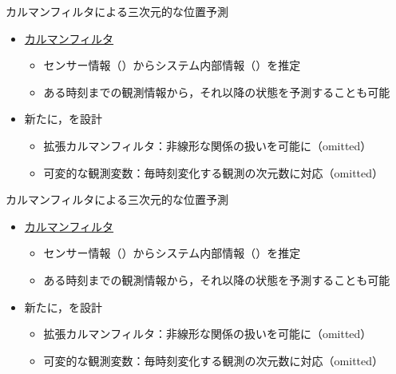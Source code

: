 \begin{frame}[noframenumbering]{カルマンフィルタによる三次元的な位置予測}
    \begin{itemize}
        \item \uline{カルマンフィルタ} \cite{bishop2001introduction}
        \begin{itemize}
            \item センサー情報（）からシステム内部情報（）を推定
            \item ある時刻までの観測情報から，それ以降の状態を予測することも可能
        \end{itemize}
        \item 新たに，を設計
        \begin{itemize}
            \item 拡張カルマンフィルタ：非線形な関係の扱いを可能に（omitted）
            \item 可変的な観測変数：毎時刻変化する観測の次元数に対応（omitted）
        \end{itemize}
    \end{itemize}
\end{frame}
\begin{frame}[noframenumbering]{カルマンフィルタによる三次元的な位置予測}
    \begin{itemize}
        \item \uline{カルマンフィルタ} \cite{bishop2001introduction}
        \begin{itemize}
            \item センサー情報（）からシステム内部情報（）を推定
            \item ある時刻までの観測情報から，それ以降の状態を予測することも可能
        \end{itemize}
        \item 新たに，を設計
        \begin{itemize}
            \item 拡張カルマンフィルタ：非線形な関係の扱いを可能に（omitted）
            \item 可変的な観測変数：毎時刻変化する観測の次元数に対応（omitted）
        \end{itemize}
    \end{itemize}
\end{frame}

